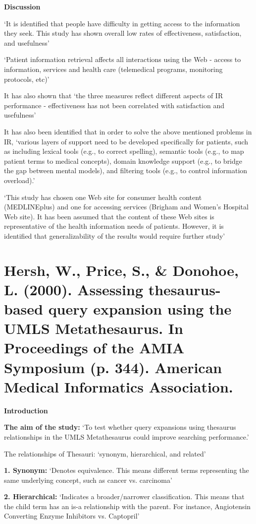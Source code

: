 \documentclass[]{article}
\begin{document}
{{{\textbf{Discussion}

‘It is identified that people have difficulty in getting access to the information they seek. This study has shown overall low rates of effectiveness, satisfaction, and usefulness’

‘Patient information retrieval affects all interactions using the Web - access to information, services and health care (telemedical programs, monitoring protocols, etc)’

It has also shown that ‘the three measures reflect different aspects of IR performance - effectiveness has not been correlated with satisfaction and usefulness’

It has also been identified that in order to solve the above mentioned problems in IR, ‘various layers of support need to be developed specifically for patients, such as including lexical tools (e.g., to correct spelling), semantic tools (e.g., to map patient terms to medical concepts), domain knowledge support (e.g., to bridge the gap between mental models), and filtering tools (e.g., to control information overload).’

‘This study has chosen one Web site for consumer health content (MEDLINEplus) and one for accessing services (Brigham and Women's Hospital Web site). It has been assumed that the content of these Web sites is representative of the health information needs of patients. However, it is identified that  generalizability of the results would require further study’

\section{Hersh, W., Price, S., & Donohoe, L. (2000). Assessing thesaurus-based query expansion using the UMLS Metathesaurus. In Proceedings of the AMIA Symposium (p. 344). American Medical Informatics Association.}

\textbf{Introduction}

\textbf{The aim of the study:} ‘To test whether query expansions using thesaurus relationships in the UMLS Metathesaurus could improve searching performance.’ 

The relationships of Thesauri: ‘synonym, hierarchical, and related’

\textbf{1.	Synonym:} ‘Denotes equivalence. This means different terms representing the same underlying concept, such as cancer vs. carcinoma’

\textbf{2.	Hierarchical:} ‘Indicates a broader/narrower classification. This means that the child term has an is-a relationship with the parent. For instance, Angiotensin Converting Enzyme Inhibitors vs. Captopril’

}}}
\end{document}
